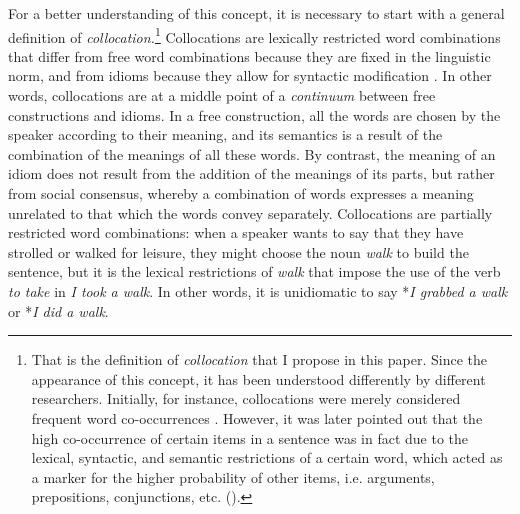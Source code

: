 \documentclass[output=paper,colorlinks,citecolor=brown]{langscibook}
\begin{document}
For a better understanding of this concept, it is necessary to start with a general
definition of \emph{collocation.}\footnote{That is the definition of \emph{collocation}
  that I propose in this paper. Since the appearance of this concept, it has been
  understood differently by different researchers. Initially, for instance, collocations
  were merely considered frequent word co-occurrences
  \parencites{firth_papers_1964}[276]{halliday_categories_1961}. However, it was later
  pointed out that the high co-occurrence of certain items in a sentence was in fact due
  to the lexical, syntactic, and semantic restrictions of a certain word, which acted as a
  marker for the higher probability of other items, i.e. arguments, prepositions,
  conjunctions, etc. (\cite{harris_theory_1976}).} Collocations are lexically restricted
word combinations that differ from free word combinations because they are fixed in the
linguistic norm, and from idioms because they allow for syntactic modification
\parencites[66]{corpas_manual_1997}[20-21]{alonso_ramos_construcciones_2004}. In other
words, collocations are at a middle point of a \emph{continuum} between free constructions
and idioms. In a free construction, all the words are chosen by the speaker according to their
meaning, and its semantics is a result of the combination of the meanings of all these
words. By contrast, the meaning of an idiom does not result from the addition of the meanings of its
parts, but rather from social consensus, whereby a combination of words expresses a
meaning unrelated to that which the words convey separately. Collocations are partially
restricted word combinations: when a speaker wants to say that they have strolled or
walked for leisure, they might choose the noun \emph{walk} to build the sentence, but it
is the lexical restrictions of \emph{walk} that impose the use of the verb \emph{to take}
in \emph{I took a walk}. In other words, it is unidiomatic to say *\emph{I grabbed a walk}
or *\emph{I did a walk}.
\end{document}
